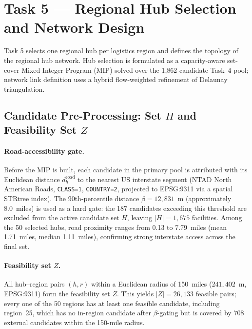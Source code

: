 
\section{Task 5 — Regional Hub Selection and Network Design}

Task 5 selects one regional hub per logistics region and defines the topology of the
regional hub network. Hub selection is formulated as a capacity-aware set-cover Mixed
Integer Program (MIP) solved over the 1,862-candidate Task~4 pool; network link
definition uses a hybrid flow-weighted refinement of Delaunay triangulation.

\subsection{Candidate Pre-Processing: Set $H$ and Feasibility Set $Z$}

\paragraph{Road-accessibility gate.}
Before the MIP is built, each candidate in the primary pool is attributed with its
Euclidean distance $d_h^{\text{road}}$ to the nearest US interstate segment (NTAD
North American Roads, \texttt{CLASS=1}, \texttt{COUNTRY=2}, projected to EPSG:9311
via a spatial STRtree index). The 90th-percentile distance $\beta = 12{,}831$~m
(approximately 8.0~miles) is used as a hard gate: the 187 candidates exceeding this
threshold are excluded from the active candidate set $H$, leaving $|H| = 1{,}675$
facilities. Among the 50 selected hubs, road proximity ranges from 0.13 to 7.79~miles
(mean 1.71~miles, median 1.11~miles), confirming strong interstate access across the
final set.

\paragraph{Feasibility set $Z$.}
All hub–region pairs $(h, r)$ within a Euclidean radius of 150~miles
($241{,}402$~m, EPSG:9311) form the feasibility set $Z$. This yields
$|Z| = 26{,}133$ feasible pairs; every one of the 50 regions has at least one
feasible candidate, including region~25, which has no in-region candidate after
$\beta$-gating but is covered by 708 external candidates within the 150-mile radius.

